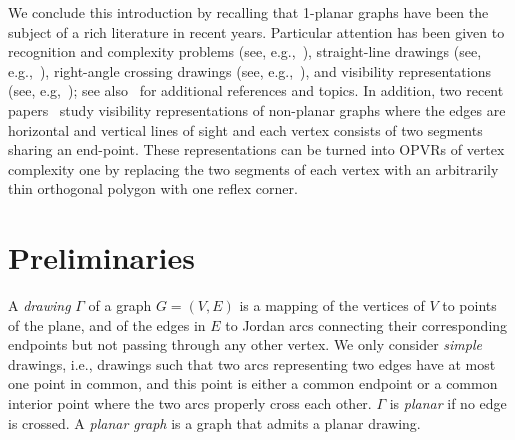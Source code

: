 \documentclass{article}
\newcommand{\opvr}{OPVR\xspace}
\begin{document}
We conclude this introduction by recalling that 1-planar graphs have been the subject of a rich literature in recent years. Particular attention has been given to   recognition and complexity problems (see, e.g.,~\cite{DBLP:conf/wads/BannisterCE13,DBLP:journals/siamcomp/CabelloM13,DBLP:journals/tcs/EadesHKLSS13,DBLP:journals/jgt/KorzhikM13}), straight-line drawings (see, e.g.,~\cite{DBLP:conf/gd/AlamBK13,t-rdg-JGT88}), right-angle crossing drawings (see, e.g.,~\cite{DBLP:conf/gd/DidimoL0M16,DBLP:journals/dam/EadesL13}), and visibility representations (see, e.g,~\cite{SoCG,DBLP:journals/jgaa/Brandenburg14,DBLP:journals/jgaa/Evans0LMW14}); see also~\cite{DBLP:journals/corr/KobourovLM17} for additional references and topics. In addition, two recent papers~\cite{DBLP:journals/tcs/EvansLM16,DBLP:journals/ipl/LiottaM16} study visibility representations of non-planar graphs where the edges are horizontal and vertical lines of sight and each vertex consists of two segments sharing an end-point. These representations can be turned into {\opvr}s of vertex complexity one by replacing the two segments of each vertex with an arbitrarily thin orthogonal polygon with one reflex corner. 



\section{Preliminaries}\label{se:preliminaries}

A \emph{drawing} $\Gamma$ of a graph $G=(V,E)$ is a mapping of the vertices of $V$ to points of the plane, and of the edges in $E$ to Jordan arcs connecting their corresponding endpoints but not passing through any other vertex. We only consider \emph{simple} drawings, i.e., drawings such that two arcs representing two edges have at most one point in common, and this point is either a common endpoint or a common interior point where the two arcs properly cross each other. $\Gamma$ is \emph{planar} if no edge is crossed. A \emph{planar graph} is a graph that admits a planar drawing.
\end{document}
